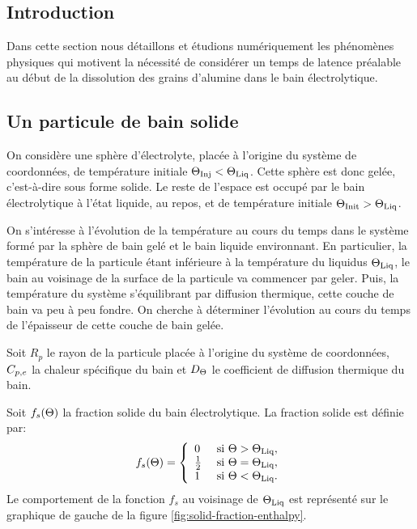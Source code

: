 \subsection*{Introduction}
Dans cette section nous détaillons et étudions numériquement les
phénomènes physiques qui motivent la nécessité de considérer un temps
de latence préalable au début de la dissolution des grains d'alumine
dans le bain électrolytique.


\subsection{Un particule de bain solide}
On considère une sphère d'électrolyte, placée à l'origine du système
de coordonnées, de température initiale $\Theta_\text{Inj}<\Theta_\text{Liq}$. Cette sphère
est donc gelée, c'est-à-dire sous forme solide. Le reste de l'espace
est occupé par le bain électrolytique à l'état liquide, au repos, et
de température initiale $\Theta_\text{Init} > \Theta_\text{Liq}$.

On s'intéresse à l'évolution de la température au cours du
temps dans le système formé par la sphère de bain gelé et le
bain liquide environnant. En particulier, la température de la
particule étant inférieure à la température du liquidus
$\Theta_\text{Liq}$, le bain au voisinage de la surface de la particule va
commencer par geler. Puis, la température du système s'équilibrant par
diffusion thermique, cette couche de bain va peu à peu fondre. On
cherche à déterminer l'évolution au cours du temps de l'épaisseur de
cette couche de bain gelée.

Soit $R_p$ le rayon de la particule placée à l'origine du
système de coordonnées, $C_{p,e}$ la chaleur spécifique du bain et
$D_\Theta$ le coefficient de diffusion thermique du bain.

Soit $f_s(\Theta)$ la fraction solide du bain électrolytique. La
fraction solide est définie par:
\begin{equation}
  f_s(\Theta) = \left\{
  \begin{array}{ll}
    0           & \text{ si } \Theta > \Theta_\text{Liq},\\
    \frac{1}{2} & \text{ si } \Theta = \Theta_\text{Liq},\\
    1           & \text{ si } \Theta < \Theta_\text{Liq}.
  \end{array}
  \right.
\end{equation}
Le comportement de la fonction $f_s$ au voisinage de $\Theta_\text{Liq}$ est
représenté sur le graphique de gauche de la figure
\ref{fig:solid-fraction-enthalpy}.

